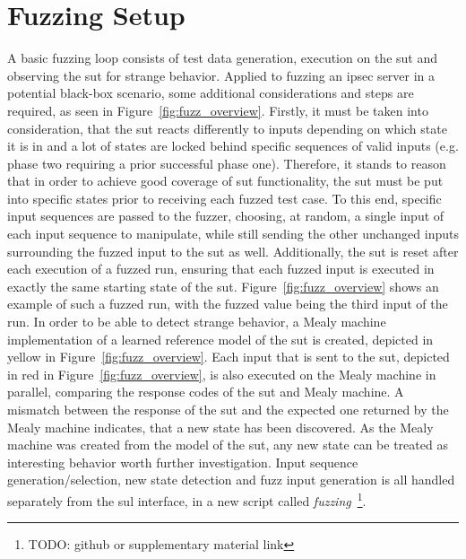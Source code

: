 \section{Fuzzing Setup} \label{sec:fuzz_intro}
A basic fuzzing loop consists of test data generation, execution on the \ac{sut} and observing the \ac{sut} for strange behavior. Applied to fuzzing an \ac{ipsec} server in a potential black-box scenario, some additional considerations and steps are required, as seen in Figure~\ref{fig:fuzz_overview}. Firstly, it must be taken into consideration, that the \ac{sut} reacts differently to inputs depending on which state it is in and a lot of states are locked behind specific sequences of valid inputs (e.g. phase two requiring a prior successful phase one). Therefore, it stands to reason that in order to achieve good coverage of \ac{sut} functionality, the \ac{sut} must be put into specific states prior to receiving each fuzzed test case. To this end, specific input sequences are passed to the fuzzer, choosing, at random, a single input of each input sequence to manipulate, while still sending the other unchanged inputs surrounding the fuzzed input to the \ac{sut} as well. Additionally, the \ac{sut} is reset after each execution of a fuzzed run, ensuring that each fuzzed input is executed in exactly the same starting state of the \ac{sut}. Figure~\ref{fig:fuzz_overview} shows an example of such a fuzzed run, with the fuzzed value being the third input of the run. In order to be able to detect strange behavior, a Mealy machine implementation of a learned reference model of the \ac{sut} is created, depicted in yellow in Figure~\ref{fig:fuzz_overview}. Each input that is sent to the \ac{sut}, depicted in red in Figure~\ref{fig:fuzz_overview}, is also executed on the Mealy machine in parallel, comparing the response codes of the \ac{sut} and Mealy machine. A mismatch between the response of the \ac{sut} and the expected one returned by the Mealy machine indicates, that a new state has been discovered. As the Mealy machine was created from the model of the \ac{sut}, any new state can be treated as interesting behavior worth further investigation. Input sequence generation/selection, new state detection and fuzz input generation is all handled separately from the \ac{sul} interface, in a new script called \emph{fuzzing}~\footnote{TODO: github or supplementary material link}.


